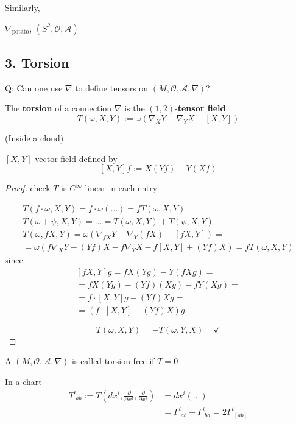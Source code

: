 	Similarly, 
	
	$\nabla_{\text{potato}}$, $(S^2, \mathcal{O}, \mathcal{A})$
	
	\subsection*{3. Torsion}
Q: Can one use $\nabla$ to define tensors on $(M,\mathcal{O}, \mathcal{A}, \nabla)$? 
	
	\begin{definition}
		The \textbf{torsion} of a connection $\nabla$ is the $(1,2)$-\textbf{tensor field}
		\begin{equation}
		T(\omega,X,Y) := \omega( \nabla_X Y - \nabla_Y X - [X,Y])
		\end{equation}
	\end{definition}
	
	(Inside a cloud) 
	
	$[X,Y]$ vector field defined by 
	\[
	[X,Y]f:= X(Yf) - Y(Xf)
	\]
	
	\begin{proof}
		check $T$ is $C^{\infty}$-linear in each entry

\[
\begin{gathered}
	T(f\cdot \omega, X, Y) = f\cdot \omega(\dots) = fT(\omega, X, Y) \\
	T(\omega + \psi, X, Y) = \dots = T(\omega, X, Y) + T(\psi, X, Y) \\
	T(\omega, fX, Y) = \omega( \nabla_{fX} Y - \nabla_Y (fX) - [fX, Y]) = \\
	= \omega(f\nabla_X Y - (Yf)X - f\nabla_Y X - f[X,Y] + (Yf)X) = fT(\omega,X,Y)
\end{gathered}
\]
since
\[
\begin{gathered} 
	[fX,Y] g = fX(Yg) - Y(fXg) = \\
	= fX(Yg) - (Yf) (Xg) - fY(Xg) = \\
	= f\cdot [X,Y] g - (Yf) Xg = \\
	= (f\cdot [X,Y] - (Yf)X) g
\end{gathered} 
\]
		
\[
T(\omega, X, Y) = -T(\omega, Y , X)  \quad \, \checkmark
\]
	\end{proof}
	
	\begin{definition}
		A $(M, \mathcal{O}, \mathcal{A}, \nabla)$ is called torsion-free if $T=0$
	\end{definition}
	
	In a chart 
	\[
	\begin{aligned}
	T^i_{ \, \, ab } := T\left(dx^i , \frac{ \partial }{ \partial x^a} , \frac{ \partial }{ \partial x^b}  \right) & = dx^i ( \dots ) \\ 
	& = \Gamma^i_{ \, \, ab} - \Gamma^i_{ \, \, ba} = 2 \Gamma^i_{ \, \, [ab] }
	\end{aligned}
	\]
	
